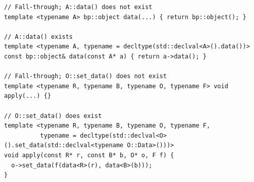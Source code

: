 \begin{lstfloat}
\begin{lstlisting}[style=cppFramedStyle,basicstyle=\scriptsize,label=lst:data,caption={Automatic generation of bindings for the overlay function traits exploiting SFINAE.}]
// Fall-through; A::data() does not exist
template <typename A> bp::object data(...) { return bp::object(); }

// A::data() exists
template <typename A, typename = decltype(std::declval<A>().data())>
const bp::object& data(const A* a) { return a->data(); }

// Fall-through; O::set_data() does not exist
template <typename R, typename B, typename O, typename F> void apply(...) {}

// O::set_data() does exist
template <typename R, typename B, typename O, typename F,
          typename = decltype(std::declval<O>().set_data(std::declval<typename O::Data>()))>
void apply(const R* r, const B* b, O* o, F f) {
  o->set_data(f(data<R>(r), data<B>(b)));
}
\end{lstlisting}
\end{lstfloat}



